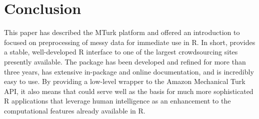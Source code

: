 \section{Conclusion}

This paper has described the MTurk platform and offered an introduction to  focused on preprocessing of messy data for immediate use in R. In short,  provides a stable, well-developed R interface to one of the largest crowdsourcing sites presently available. The package has been developed and refined for more than three years, has extensive in-package and online documentation, and is incredibly easy to use. By providing a low-level wrapper to the Amazon Mechanical Turk API, it also means that  could serve well as the basis for much more sophisticated R applications that leverage human intelligence as an enhancement to the computational features already available in R.



\address{Thomas J. Leeper\\
Department of Government\\
London School of Economics and Political Science\\
London, United Kingdom}\\
